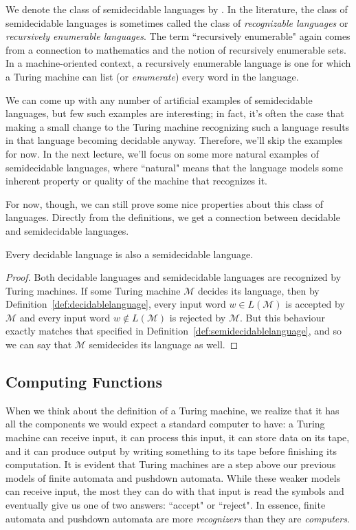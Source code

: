We denote the class of semidecidable languages by \SD. In the literature, the class of semidecidable languages is sometimes called the class of \emph{recognizable languages} or \emph{recursively enumerable languages}. The term ``recursively enumerable" again comes from a connection to mathematics and the notion of recursively enumerable sets. In a machine-oriented context, a recursively enumerable language is one for which a Turing machine can list (or \emph{enumerate}) every word in the language.

We can come up with any number of artificial examples of semidecidable languages, but few such examples are interesting; in fact, it's often the case that making a small change to the Turing machine recognizing such a language results in that language becoming decidable anyway. Therefore, we'll skip the examples for now. In the next lecture, we'll focus on some more natural examples of semidecidable languages, where ``natural" means that the language models some inherent property or quality of the machine that recognizes it.

For now, though, we can still prove some nice properties about this class of languages. Directly from the definitions, we get a connection between decidable and semidecidable languages.

\begin{theorem}\label{thm:decidableissemidecidable}
Every decidable language is also a semidecidable language.

\begin{proof}
Both decidable languages and semidecidable languages are recognized by Turing machines. If some Turing machine $\mathcal{M}$ decides its language, then by Definition~\ref{def:decidablelanguage}, every input word $w \in L(\mathcal{M})$ is accepted by $\mathcal{M}$ and every input word $w \not\in L(\mathcal{M})$ is rejected by $\mathcal{M}$. But this behaviour exactly matches that specified in Definition~\ref{def:semidecidablelanguage}, and so we can say that $\mathcal{M}$ semidecides its language as well.
\end{proof}
\end{theorem}

\subsection{Computing Functions}\label{subsec:computingfunctions}

When we think about the definition of a Turing machine, we realize that it has all the components we would expect a standard computer to have: a Turing machine can receive input, it can process this input, it can store data on its tape, and it can produce output by writing something to its tape before finishing its computation. It is evident that Turing machines are a step above our previous models of finite automata and pushdown automata. While these weaker models can receive input, the most they can do with that input is read the symbols and eventually give us one of two answers: ``accept" or ``reject". In essence, finite automata and pushdown automata are more \emph{recognizers} than they are \emph{computers}.

